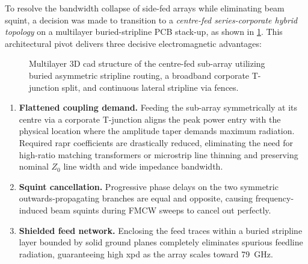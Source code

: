 To resolve the bandwidth collapse of side-fed arrays while eliminating beam squint, a decision was made to transition to a \emph{centre-fed series-corporate hybrid topology} on a multilayer buried-stripline PCB stack-up, as shown in \cref{fig:centre_fed_stripline_array_cad}.
This architectural pivot delivers three decisive electromagnetic advantages:

\begin{figure}[!ht]
    \centering
    
    \caption{Multilayer 3D \gls{cad} structure of the centre-fed sub-array utilizing buried asymmetric stripline routing, a broadband corporate T-junction split, and continuous lateral stripline via fences.}
    \label{fig:centre_fed_stripline_array_cad}
\end{figure}

\begin{enumerate}
    \item \textbf{Flattened coupling demand.} Feeding the sub-array symmetrically at its centre via a corporate T-junction aligns the peak power entry with the physical location where the amplitude taper demands maximum radiation.
    Required \gls{rapr} coefficients are drastically reduced, eliminating the need for high-ratio matching transformers or microstrip line thinning and preserving nominal $Z_0$ line width and wide impedance bandwidth.
    \item \textbf{Squint cancellation.} Progressive phase delays on the two symmetric outwards-propagating branches are equal and opposite, causing frequency-induced beam squints during FMCW sweeps to cancel out perfectly.
    \item \textbf{Shielded feed network.} Enclosing the feed traces within a buried stripline layer bounded by solid ground planes completely eliminates spurious feedline radiation, guaranteeing high \gls{xpd} as the array scales toward \qty{79}{\giga\hertz}.
\end{enumerate}

